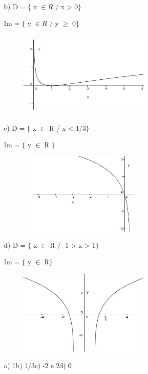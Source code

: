 \begin{respostas}{7}
b)
D = $ \{ $  x  \(  \in R \)  / x > 0$ \} $ 

Im = $ \{ $  y  \(  \in R \)  / y $ \geq $  0$ \} $ 

\begin{figure}[H]
	\begin{Center}
		\includegraphics[width=2.57in,height=1.69in]{capitulos/logaritmos_e_funcao_logaritmica/media/image35.JPG}
	\end{Center}
\end{figure}

c)
D = $ \{ $ x $ \in $ R / x < 1/3$ \} $ 

Im = $ \{ $  y $ \in $ R $ \} $ 

\begin{figure}[H]
	\begin{Center}
		\includegraphics[width=2.55in,height=1.6in]{capitulos/logaritmos_e_funcao_logaritmica/media/image36.JPG}
	\end{Center}
\end{figure}

d)
D = $ \{ $  x $ \in $ R / -1 > x > 1$ \} $

Im = $ \{ $  y $ \in $ R$ \} $

\begin{figure}[H]
	\begin{Center}
		\includegraphics[width=2.55in,height=1.66in]{capitulos/logaritmos_e_funcao_logaritmica/media/image37.JPG}
	\end{Center}
\end{figure}


\ansitem{}  a) 1\quad \quad b) 1/3\quad \quad c) -2 e 2\quad \quad d) 0

\end{respostas}

